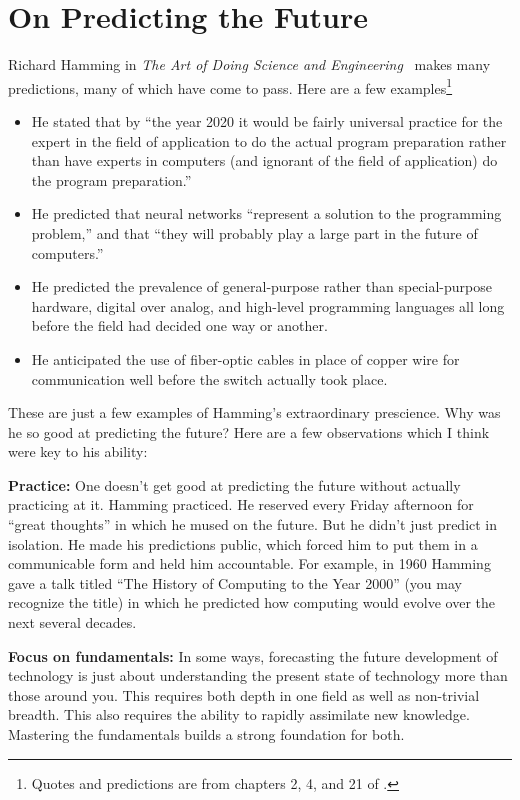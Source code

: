 \section{On Predicting the Future}
\label{sec:predicting_future}

Richard Hamming in \emph{The Art of
Doing Science and Engineering}~\citep{hamming1997art} makes many predictions,
many of which have come to pass. Here are a few examples\footnote{Quotes and
predictions are from chapters 2, 4, and 21 of \citet{hamming1997art}.}
\begin{itemize}
    \item He stated that by ``the year 2020 it would be fairly universal
        practice for the expert in the field of application to do the actual
        program preparation rather than have experts in computers (and ignorant
        of the field of application) do the program preparation.''
    \item He predicted that neural networks ``represent a solution to the
        programming problem,'' and that ``they will probably play a large part
        in the future of computers.''
    \item He predicted the prevalence of general-purpose rather than
        special-purpose hardware, digital over analog, and high-level
        programming languages all long before the field had decided one way or
        another.
    \item He anticipated the use of fiber-optic cables in place of copper wire
        for communication well before the switch actually took place.
\end{itemize}

These are just a few examples of Hamming's extraordinary prescience. Why was he
so good at predicting the future? Here are a few observations which I think
were key to his ability:

{\bf Practice:} One doesn't get good at predicting the future without actually
practicing at it. Hamming practiced. He reserved every Friday afternoon for
``great thoughts'' in which he mused on the future. But he didn't just predict
in isolation. He made his predictions public, which forced him to put them in a
communicable form and held him accountable. For example, in 1960 Hamming gave a
talk titled ``The History of Computing to the Year 2000'' (you may recognize
the title) in which he predicted how computing would evolve over the next
several decades.

{\bf Focus on fundamentals:} In some ways, forecasting the future development
of technology is just about understanding the present state of technology more
than those around you. This requires both depth in one field as well as
non-trivial breadth. This also requires the ability to rapidly assimilate new
knowledge. Mastering the fundamentals builds a strong foundation for both.

